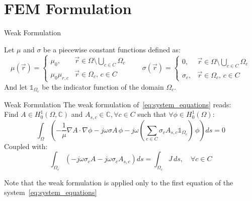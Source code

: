 \documentclass[aspectratio=54,xcolor=dvipsnames]{beamer}
\begin{document}
\section{FEM Formulation}
\begin{frame}{Weak Formulation}
    \begin{footnotesize}
    Let $\mu$ and $\sigma$ be a piecewise constant functions defined as:
    \[
    \mu(\vec{r}) = 
    \begin{cases}
        \mu_0, & \vec{r} \in \Omega \setminus \bigcup_{c \in C} \Omega_c \\
        \mu_0\mu_{r,c} & \vec{r} \in \Omega_c, \, c \in C
    \end{cases}
    \qquad
    \sigma(\vec{r}) = 
    \begin{cases}
        0, & \vec{r} \in \Omega \setminus \bigcup_{c \in C} \Omega_c \\
        \sigma_c, & \vec{r} \in \Omega_c, \, c \in C
    \end{cases}
    \]
    And let $\mathds{1}_{\Omega_c}$ be the indicator function of the domain $\Omega_c$. \\
    \begin{block}{Weak Formulation}
    The weak formulation of~\eqref{eq:system_equations} reads: \\
    Find $A \in H^1_0(\Omega, \mathbb{C})$ and $A_{s,c} \in \mathbb{C}, \forall c \in C$ such that $\forall \phi \in H^1_0(\Omega)$:
    \begin{equation} 
        \int_{\Omega} \left( -\frac{1}{\mu} \nabla A \cdot \nabla \phi - j\omega \sigma A \, \phi - j\omega \left(\sum_{c \in C} \sigma_c A_{s,c} \mathds{1}_{\Omega_c} \right) \, \phi \right) ds = 0
        \label{eq:weak_formulation}
    \end{equation}
    Coupled with:
    \begin{equation}
        \int_{\Omega_c} \left(- j\omega \sigma_c A - j\omega \sigma_c A_{s,c} \right) ds = \int_{\Omega_c} J \, ds, \quad \forall c \in C
        \label{eq:current_constraint_weak}
    \end{equation}
    \end{block}
    Note that the weak formulation is applied only to the first equation of the system~\eqref{eq:system_equations}
    \end{footnotesize}
\end{frame}
\end{document}
